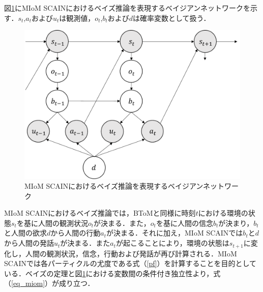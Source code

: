 \par
図\ref{fig:miom}にMIoM SCAINにおけるベイズ推論を表現するベイジアンネットワークを示す．$s_t$,$a_t$および$u_t$は観測値，$o_t$,$b_t$および$d$は確率変数として扱う．
\begin{figure}[htbp]
  \begin{center}
    \includegraphics[scale=0.73]{./miom.pdf}
    \caption{MIoM SCAINにおけるベイズ推論を表現するベイジアンネットワーク}
    \label{fig:miom}
  \end{center}
\end{figure}
MIoM SCAINにおけるベイズ推論では，BToMと同様に時刻$t$における環境の状態$s_{t}$を基に人間の観測状況$o_{t}$が決まる．また，$o_{t}$を基に人間の信念$b_{t}$が決まり，$b_{t}$と人間の欲求$d$から人間の行動$a_{t}$が決まる．それに加え，MIoM SCAINでは$b_t$と$d$から人間の発話$u_t$が決まる．また$a_{t}$が起こることにより，環境の状態は$s_{t+1}$に変化し，人間の観測状況，信念，行動および発話が再び計算される．MIoM SCAINでは各パーティクルの尤度である式（\ref{pf}）を計算することを目的としている．ベイズの定理と図\ref{fig:miom}における変数間の条件付き独立性より，式（\ref{eq_miom}）が成り立つ．
